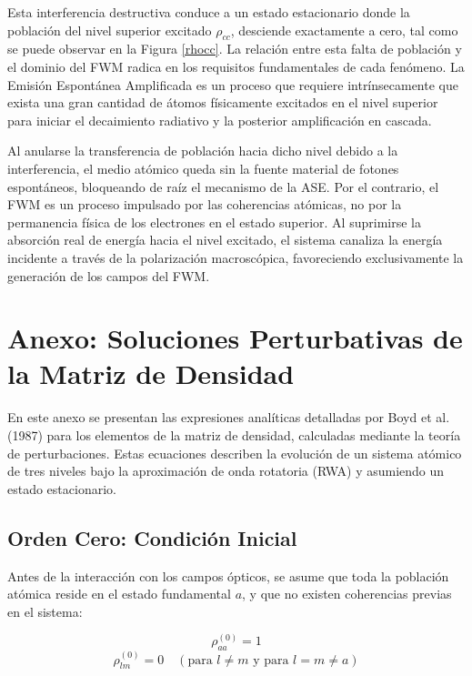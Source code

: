 \documentclass[12pt,a4paper]{article}
\begin{document}
Esta interferencia destructiva conduce a un estado estacionario donde la población del nivel superior excitado $\rho_{cc}$, desciende exactamente a cero, tal como se puede observar en la Figura \ref{rhocc}. La relación entre esta falta de población y el dominio del FWM radica en los requisitos fundamentales de cada fenómeno. La Emisión Espontánea Amplificada es un proceso que requiere intrínsecamente que exista una gran cantidad de átomos físicamente excitados en el nivel superior para iniciar el decaimiento radiativo y la posterior amplificación en cascada. 

Al anularse la transferencia de población hacia dicho nivel debido a la interferencia, el medio atómico queda sin la fuente material de fotones espontáneos, bloqueando de raíz el mecanismo de la ASE. Por el contrario, el FWM es un proceso impulsado por las coherencias atómicas, no por la permanencia física de los electrones en el estado superior. Al suprimirse la absorción real de energía hacia el nivel excitado, el sistema canaliza la energía incidente a través de la polarización macroscópica, favoreciendo exclusivamente la generación de los campos del FWM.




\newpage
\appendix
\section{Anexo: Soluciones Perturbativas de la Matriz de Densidad}
\label{density_matrix}

En este anexo se presentan las expresiones analíticas detalladas por Boyd et al. (1987) para los elementos de la matriz de densidad, calculadas mediante la teoría de perturbaciones. Estas ecuaciones describen la evolución de un sistema atómico de tres niveles bajo la aproximación de onda rotatoria (RWA) y asumiendo un estado estacionario.

\subsection*{Orden Cero: Condición Inicial}
Antes de la interacción con los campos ópticos, se asume que toda la población atómica reside en el estado fundamental $a$, y que no existen coherencias previas en el sistema:

\begin{equation}
\rho_{aa}^{(0)} = 1 \tag{1a}
\end{equation}
\begin{equation}
\rho_{lm}^{(0)} = 0 \quad (\text{para } l \neq m \text{ y para } l = m \neq a) \tag{1b}
\end{equation}
\end{document}
